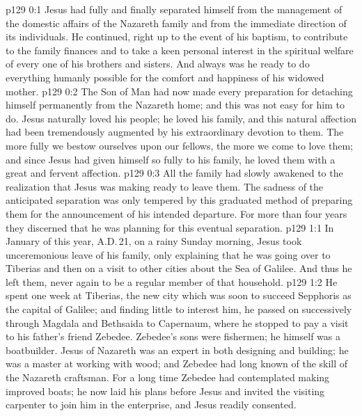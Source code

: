\author{Midwayer Commission}
\vs p129 0:1 Jesus had fully and finally separated himself from the management of the domestic affairs of the Nazareth family and from the immediate direction of its individuals. He continued, right up to the event of his baptism, to contribute to the family finances and to take a keen personal interest in the spiritual welfare of every one of his brothers and sisters. And always was he ready to do everything humanly possible for the comfort and happiness of his widowed mother.
\vs p129 0:2 The Son of Man had now made every preparation for detaching himself permanently from the Nazareth home; and this was not easy for him to do. Jesus naturally loved his people; he loved his family, and this natural affection had been tremendously augmented by his extraordinary devotion to them. The more fully we bestow ourselves upon our fellows, the more we come to love them; and since Jesus had given himself so fully to his family, he loved them with a great and fervent affection.
\vs p129 0:3 All the family had slowly awakened to the realization that Jesus was making ready to leave them. The sadness of the anticipated separation was only tempered by this graduated method of preparing them for the announcement of his intended departure. For more than four years they discerned that he was planning for this eventual separation.
\vs p129 1:1 In January of this year, A.D.\,21, on a rainy Sunday morning, Jesus took unceremonious leave of his family, only explaining that he was going over to Tiberias and then on a visit to other cities about the Sea of Galilee. And thus he left them, never again to be a regular member of that household.
\vs p129 1:2 He spent one week at Tiberias, the new city which was soon to succeed Sepphoris as the capital of Galilee; and finding little to interest him, he passed on successively through Magdala and Bethsaida to Capernaum, where he stopped to pay a visit to his father’s friend Zebedee. Zebedee’s sons were fishermen; he himself was a boatbuilder. Jesus of Nazareth was an expert in both designing and building; he was a master at working with wood; and Zebedee had long known of the skill of the Nazareth craftsman. For a long time Zebedee had contemplated making improved boats; he now laid his plans before Jesus and invited the visiting carpenter to join him in the enterprise, and Jesus readily consented.
